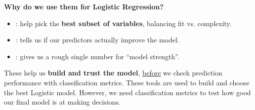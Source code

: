 \highspace
\begin{flushleft}
    \textcolor{Green3}{ \textbf{Why do we use them for Logistic Regression?}}
\end{flushleft}
\begin{itemize}
    \item {}: help pick the \textbf{best subset of variables}, balancing fit vs. complexity.
    \item {}: tells us if our predictors actually improve the model.
    \item {}: gives us a rough single number for ``model strength''.
\end{itemize}
These help us \textbf{build and trust the model}, \underline{before} we check prediction performance with classification metrics. These tools are used to build and choose the best Logistic model. However, we need classification metrics to test how good our final model is at making decisions.